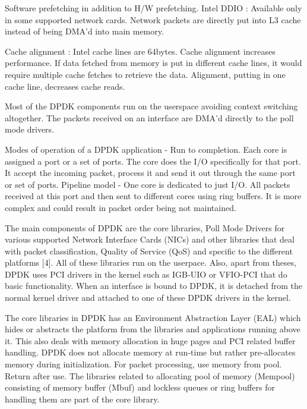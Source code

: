 \documentclass[english, 12pt, a4paper, elec, utf8, a-1b, online]{aaltothesis}
\begin{document}
Software prefetching in addition to H/W prefetching. 
Intel DDIO : Available only in some supported network cards. Network packets are directly put into L3 cache instead of being DMA'd into main memory.

Cache alignment : Intel cache lines are 64bytes. Cache alignment increases performance. If data fetched from memory is put in different cache lines, it would require multiple cache fetches to retrieve the data. Alignment, putting in one cache line, decreases cache reads.

Most of the DPDK components run on the userspace avoiding context switching altogether. The packets received on an interface are DMA'd directly to the poll mode drivers. 

Modes of operation of a DPDK application - Run to completion. Each core is assigned a port or a set of ports. The core does the I/O specifically for that port. It accept the incoming packet, process it and send it out through the same port or set of ports. Pipeline model - One core is dedicated to just I/O. All packets received at this port and then sent to different cores using ring buffers. It is more complex and could result in packet order being not maintained.

The main components of DPDK are the core libraries, Poll Mode Drivers for various supported Network Interface Cards (NICs) and other libraries that deal with packet classification, Quality of Service (QoS) and specific to the different platforms [4]. All of these libraries run on the userpace. Also, apart from theses, DPDK uses PCI drivers in the kernel such as IGB-UIO or VFIO-PCI that do basic functionality. When an interface is bound to DPDK, it is detached from the normal kernel driver and attached to one of these DPDK drivers in the kernel.


The core libraries in DPDK has an Environment Abstraction Layer (EAL) which hides or abstracts the platform from the libraries and applications running above it. This also deals with memory allocation in huge pages and PCI related buffer handling. DPDK does not allocate memory at run-time but rather pre-allocates memory during initialization. For packet processing, use memory from pool. Return after use. The libraries related to allocating pool of memory (Mempool) consisting of memory buffer (Mbuf) and lockless queues or ring buffers for handling them are part of the core library.
\end{document}
